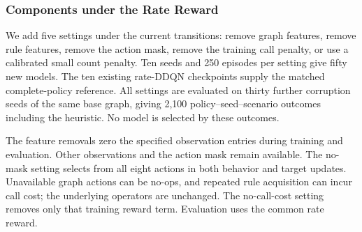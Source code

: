 \subsubsection{Components under the Rate Reward}

\label{sec:rate_ablation}

We add five settings under the current transitions: remove graph features, remove rule features, remove the action mask, remove the training call penalty, or use a calibrated small count penalty. Ten seeds and 250 episodes per setting give fifty new models. The ten existing rate-DDQN checkpoints supply the matched complete-policy reference. All settings are evaluated on thirty further corruption seeds of the same base graph, giving 2,100 policy--seed--scenario outcomes including the heuristic. No model is selected by these outcomes.

The feature removals zero the specified observation entries during training and evaluation. Other observations and the action mask remain available. The no-mask setting selects from all eight actions in both behavior and target updates. Unavailable graph actions can be no-ops, and repeated rule acquisition can incur call cost; the underlying operators are unchanged. The no-call-cost setting removes only that training reward term. Evaluation uses the common rate reward.

